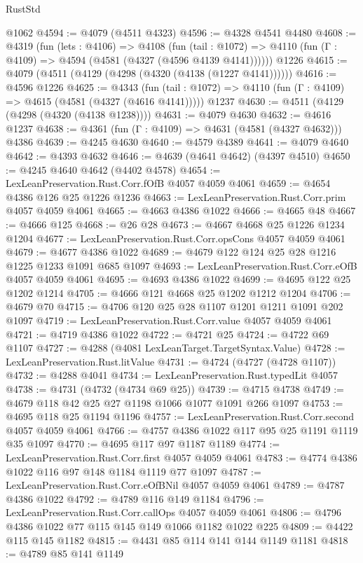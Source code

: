 \begin{lexlean}{RustStd}
\begin{coremodule}
{\begin{coremodule}
{{{{{{{{{{{{{{    @1062
@4594 := @4079 (@4511 @4323)
@4596 := @4328 @4541 @4480
@4608 := @4319
    (fun (lets : @4106) =>
    @4108
      (fun (tail : @1072) => @4110 (fun (Γ : @4109) => @4594 (@4581 (@4327 (@4596 @4139 @4141))))))
    @1226
@4615 := @4079 (@4511 (@4129 (@4298 (@4320 (@4138 (@1227 @4141))))))
@4616 := @4596 @1226
@4625 := @4343
    (fun (tail : @1072) => @4110 (fun (Γ : @4109) => @4615 (@4581 (@4327 (@4616 @4141)))))
    @1237
@4630 := @4511 (@4129 (@4298 (@4320 (@4138 @1238))))
@4631 := @4079 @4630
@4632 := @4616 @1237
@4638 := @4361 (fun (Γ : @4109) => @4631 (@4581 (@4327 @4632))) @4386
@4639 := @4245 @4630
@4640 := @4579 @4389
@4641 := @4079 @4640
@4642 := @4393 @4632
@4646 := @4639 (@4641 @4642) (@4397 @4510)
@4650 := @4245 @4640 @4642 (@4402 @4578)
@4654 := LexLeanPreservation.Rust.Corr.fOfB @4057 @4059 @4061
@4659 := @4654 @4386 @126 @25 @1226 @1236
@4663 := LexLeanPreservation.Rust.Corr.prim @4057 @4059 @4061
@4665 := @4663 @4386 @1022
@4666 := @4665 @48
@4667 := @4666 @125
@4668 := @26 @28
@4673 := @4667 @4668 @25 @1226 @1234 @1204
@4677 := LexLeanPreservation.Rust.Corr.opsCons @4057 @4059 @4061
@4679 := @4677 @4386 @1022
@4689 := @4679 @122 @124 @25 @28 @1216 @1225 @1233 @1091 @685 @1097
@4693 := LexLeanPreservation.Rust.Corr.eOfB @4057 @4059 @4061
@4695 := @4693 @4386 @1022
@4699 := @4695 @122 @25 @1202 @1214
@4705 := @4666 @121 @4668 @25 @1202 @1212 @1204
@4706 := @4679 @70
@4715 := @4706 @120 @25 @28 @1107 @1201 @1211 @1091 @202 @1097
@4719 := LexLeanPreservation.Rust.Corr.value @4057 @4059 @4061
@4721 := @4719 @4386 @1022
@4722 := @4721 @25
@4724 := @4722 @69 @1107
@4727 := @4288 (@4081 LexLeanTarget.TargetSyntax.Value)
@4728 := LexLeanPreservation.Rust.litValue
@4731 := @4724 (@4727 (@4728 @1107))
@4732 := @4288 @4041
@4734 := LexLeanPreservation.Rust.typedLit @4057
@4738 := @4731 (@4732 (@4734 @69 @25))
@4739 := @4715 @4738
@4749 := @4679 @118 @42 @25 @27 @1198 @1066 @1077 @1091 @266 @1097
@4753 := @4695 @118 @25 @1194 @1196
@4757 := LexLeanPreservation.Rust.Corr.second @4057 @4059 @4061
@4766 := @4757 @4386 @1022 @117 @95 @25 @1191 @1119 @35 @1097
@4770 := @4695 @117 @97 @1187 @1189
@4774 := LexLeanPreservation.Rust.Corr.first @4057 @4059 @4061
@4783 := @4774 @4386 @1022 @116 @97 @148 @1184 @1119 @77 @1097
@4787 := LexLeanPreservation.Rust.Corr.eOfBNil @4057 @4059 @4061
@4789 := @4787 @4386 @1022
@4792 := @4789 @116 @149 @1184
@4796 := LexLeanPreservation.Rust.Corr.callOps @4057 @4059 @4061
@4806 := @4796 @4386 @1022 @77 @115 @145 @149 @1066 @1182 @1022 @225
@4809 := @4422 @115 @145 @1182
@4815 := @4431 @85 @114 @141 @144 @1149 @1181
@4818 := @4789 @85 @141 @1149
}}}}}}}}}}}}}}
\end{coremodule}}
\end{coremodule}
\end{lexlean}

